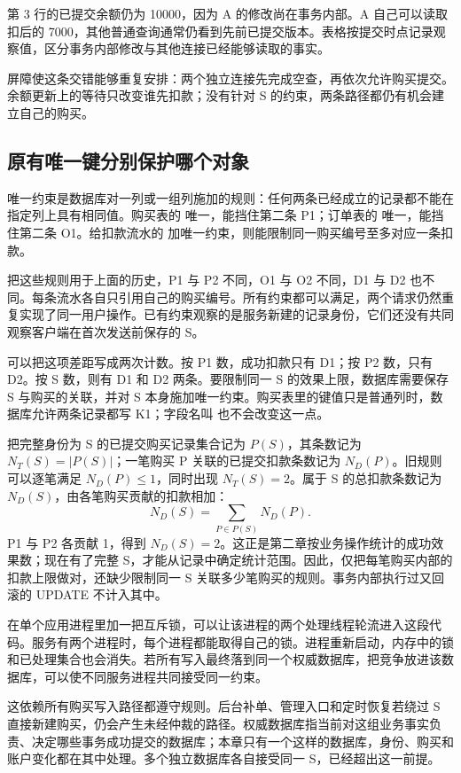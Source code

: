 第 3 行的已提交余额仍为 10000，因为 A 的修改尚在事务内部。A 自己可以读取扣后的 7000，其他普通查询通常仍看到先前已提交版本。表格按提交时点记录观察值，区分事务内部修改与其他连接已经能够读取的事实。

屏障使这条交错能够重复安排：两个独立连接先完成空查，再依次允许购买提交。余额更新上的等待只改变谁先扣款；没有针对 S 的约束，两条路径都仍有机会建立自己的购买。

\subsection*{原有唯一键分别保护哪个对象}

唯一约束是数据库对一列或一组列施加的规则：任何两条已经成立的记录都不能在指定列上具有相同值。购买表的  唯一，能挡住第二条 P1；订单表的  唯一，能挡住第二条 O1。给扣款流水的  加唯一约束，则能限制同一购买编号至多对应一条扣款。

把这些规则用于上面的历史，P1 与 P2 不同，O1 与 O2 不同，D1 与 D2 也不同。每条流水各自只引用自己的购买编号。所有约束都可以满足，两个请求仍然重复实现了同一用户操作。已有约束观察的是服务新建的记录身份，它们还没有共同观察客户端在首次发送前保存的 S。

可以把这项差距写成两次计数。按 P1 数，成功扣款只有 D1；按 P2 数，只有 D2。按 S 数，则有 D1 和 D2 两条。要限制同一 S 的效果上限，数据库需要保存 S 与购买的关联，并对 S 本身施加唯一约束。购买表里的键值只是普通列时，数据库允许两条记录都写 K1；字段名叫  也不会改变这一点。



把完整身份为 S 的已提交购买记录集合记为 \(P(S)\)，其条数记为 \(N_T(S)=|P(S)|\)；一笔购买 P 关联的已提交扣款条数记为 \(N_D(P)\)。旧规则可以逐笔满足 \(N_D(P)\leq 1\)，同时出现 \(N_T(S)=2\)。属于 S 的总扣款条数记为 \(N_D(S)\)，由各笔购买贡献的扣款相加：
\[
 N_D(S)=\sum_{P\in P(S)}N_D(P).
\]
P1 与 P2 各贡献 1，得到 \(N_D(S)=2\)。这正是第二章按业务操作统计的成功效果数；现在有了完整 S，才能从记录中确定统计范围。因此，仅把每笔购买内部的扣款上限做对，还缺少限制同一 S 关联多少笔购买的规则。事务内部执行过又回滚的 UPDATE 不计入其中。

在单个应用进程里加一把互斥锁，可以让该进程的两个处理线程轮流进入这段代码。服务有两个进程时，每个进程都能取得自己的锁。进程重新启动，内存中的锁和已处理集合也会消失。若所有写入最终落到同一个权威数据库，把竞争放进该数据库，可以使不同服务进程共同接受同一约束。

这依赖所有购买写入路径都遵守规则。后台补单、管理入口和定时恢复若绕过 S 直接新建购买，仍会产生未经仲裁的路径。权威数据库指当前对这组业务事实负责、决定哪些事务成功提交的数据库；本章只有一个这样的数据库，身份、购买和账户变化都在其中处理。多个独立数据库各自接受同一 S，已经超出这一前提。

